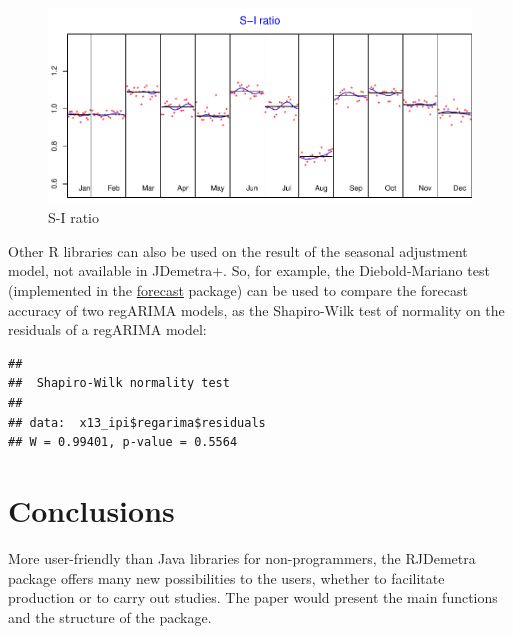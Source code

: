 \documentclass[12pt,a4paper]{article}
\def\thisfile{ntts2019abstract}
\newenvironment{Shaded}{\begin{snugshade}}{\end{snugshade}}
\newcommand{\KeywordTok}[1]{\textcolor[rgb]{0.13,0.29,0.53}{\textbf{#1}}}
\newcommand{\OperatorTok}[1]{\textcolor[rgb]{0.81,0.36,0.00}{\textbf{#1}}}
\newcommand{\NormalTok}[1]{#1}
\begin{document}
\begin{figure}[H]
\centering
\includegraphics{NTTS_files/figure-latex/unnamed-chunk-3-1.pdf}
\caption{\label{fig:sa_si_ratio}S-I ratio}
\end{figure}

Other R libraries can also be used on the result of the seasonal
adjustment model, not available in JDemetra+. So, for example, the
Diebold-Mariano test \cite{dmtest} (implemented in the
\href{ttps://CRAN.R-project.org/package=forecast}{forecast} package) can
be used to compare the forecast accuracy of two regARIMA models, as the
Shapiro-Wilk test of normality \cite{shapiro} on the residuals of a regARIMA model:

\begin{Shaded}
\end{Shaded}

\begin{verbatim}
## 
##  Shapiro-Wilk normality test
## 
## data:  x13_ipi$regarima$residuals
## W = 0.99401, p-value = 0.5564
\end{verbatim}

\section{Conclusions}\label{conclusions}

More user-friendly than Java libraries for non-programmers, the RJDemetra package offers many new possibilities to the users, whether to facilitate production or to carry out studies. The paper would present the main functions and the structure of the package. 


\renewcommand{\refname}{References}





\end{document}
